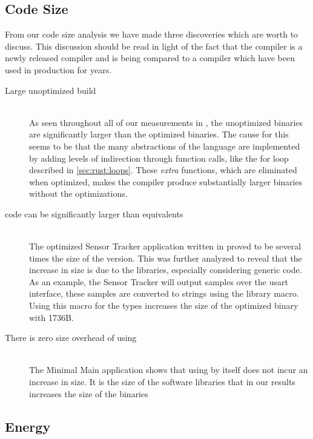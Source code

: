 \subsection{Code Size}

From our code size analysis we have made three discoveries which are worth to discuss.
This discussion should be read in light of the fact that the {\rust} compiler is a newly released compiler and is being compared to a {\C} compiler which have been used in production for years.

\begin{description}

\item [Large unoptimized {\rust} build] \hfill \\
  As seen throughout all of our measurements in {\rust}, the unoptimized binaries are significantly larger than the optimized binaries.
  The cause for this seems to be that the many abstractions of the {\rust} language are implemented by adding levels of indirection through function calls, like the for loop described in \autoref{sec:rust:loops}.
  These \emph{extra} functions, which are eliminated when optimized, makes the compiler produce substantially larger binaries without the optimizations.

\item [{\rust} code can be significantly larger than {\C} equivalents] \hfill \\
  The optimized Sensor Tracker application written in {\rust} proved to be several times the size of the {\C} version.
  This was further analyzed to reveal that the increase in size is due to the {\rust} libraries, especially considering generic code.
  As an example, the Sensor Tracker will output samples over the \gls{usart} interface, these samples are converted to strings using the {\core} library  macro.
  Using this macro for the types  increases the size of the optimized binary with 1736B.

\item [There is zero size overhead of using {\rust}] \hfill \\
  The Minimal Main application shows that using {\rust} by itself does not incur an increase in size.
  It is the size of the software libraries that in our results increases the size of the {\rust} binaries

\end{description}

\subsection{Energy}

